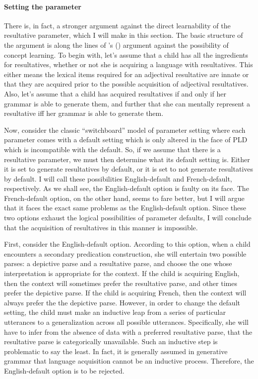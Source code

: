 \documentclass[MilwayThesis]{subfiles}
\begin{document}
\paragraph{Setting the parameter}
There is, in fact, a stronger argument against the direct learnability of the resultative parameter, which I will make in this section.
The basic structure of the argument is along the lines of \citeauthor{fodor1975language}'s (\citeyear{fodor1975language}) argument against the possibility of concept learning.
To begin with, let's assume that a child has all the ingredients for resultatives, whether or not she is acquiring a language with resultatives.
This either means the lexical items required for an adjectival resultative are innate or that they are acquired prior to the possible acquisition of adjectival resultatives.
Also, let's assume that a child has acquired resultatives if and only if her grammar is able to generate them, and further that she can mentally represent a resultative iff her grammar is able to generate them.

Now, consider the classic ``switchboard'' model of parameter setting where each parameter comes with a default setting which is only altered in the face of PLD which is incompatible with the default.
So, if we assume that there is a resultative parameter, we must then determine what its default setting is.
Either it is set to generate resultatives by default, or it is set to not generate resultatives by default.
I will call these possibilities English-default and French-default, respectively.
As we shall see, the English-default option is faulty on its face.
The French-default option, on the other hand, seems to fare better, but I will argue that it faces the exact same problems as the English-default option.
Since these two options exhaust the logical possibilities of parameter defaults, I will conclude that the acquisition of resultatives in this manner is impossible.

First, consider the English-default option.
According to this option, when a child encounters a secondary predication construction, she will entertain two possible parses: a depictive parse and a resultative parse, and choose the one whose interpretation is appropriate for the context.
If the child is acquiring English, then the context will sometimes prefer the resultative parse, and other times prefer the depictive parse.
If the child is acquiring French, then the context will always prefer the the depictive parse.
However, in order to change the default setting, the child must make an inductive leap from a series of particular utterances to a generalization across all possible utterances.
Specifically, she will have to infer from the absence of data with a preferred resultative parse, that the resultative parse is categorically unavailable.
Such an inductive step is problematic to say the least.
In fact, it is generally assumed in generative grammar that language acquisition cannot be an inductive process.\parencite{fodor1980fixation,chomsky1980stating}
Therefore, the English-default option is to be rejected.
\end{document}
